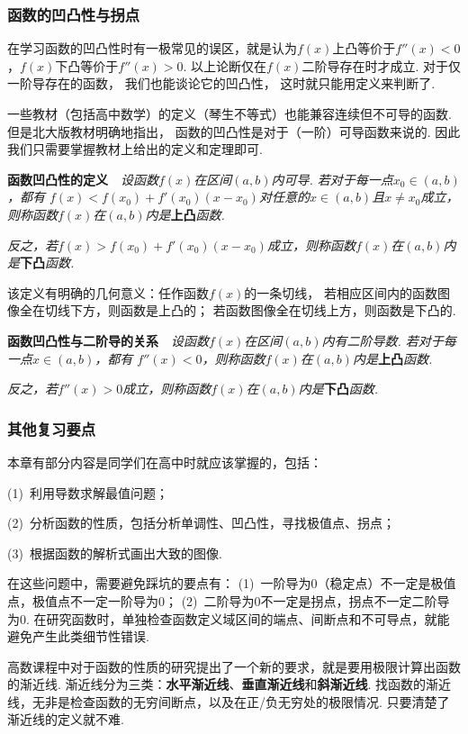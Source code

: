 \subsubsection{函数的凹凸性与拐点}\par
在学习函数的凹凸性时有一极常见的误区，就是认为$f(x)$上凸等价于$f''(x)<0$，$f(x)$下凸等价于$f''(x)>0$.
以上论断仅在$f(x)$二阶导存在时才成立.
对于仅一阶导存在的函数，
我们也能谈论它的凹凸性，
这时就只能用定义来判断了.

一些教材（包括高中数学）的定义（琴生不等式）也能兼容连续但不可导的函数.
但是北大版教材明确地指出，
函数的凹凸性是对于（一阶）可导函数来说的.
因此我们只需要掌握教材上给出的定义和定理即可.\par \vspace{1em}

\textbf{函数凹凸性的定义}~~\textit{设函数$f(x)$在区间$(a,b)$内可导. 若对于每一点$x_0 \in (a,b)$，都有
$f(x) < f(x_0) + f'(x_0)(x-x_0)$对任意的$x \in (a,b)$且$x \ne x_0$成立，则称函数$f(x)$在$(a,b)$内是}\textbf{上凸}\textit{函数.} \par
\textit{反之，若$f(x) > f(x_0) + f'(x_0)(x-x_0)$成立，则称函数$f(x)$在$(a,b)$内是}\textbf{下凸}\textit{函数.}\par \vspace{1em}

该定义有明确的几何意义：任作函数$f(x)$的一条切线，
若相应区间内的函数图像全在切线下方，则函数是上凸的；
若函数图像全在切线上方，则函数是下凸的. \par \vspace{1em}

\textbf{函数凹凸性与二阶导的关系}~~\textit{设函数$f(x)$在区间$(a,b)$内有二阶导数. 若对于每一点$x \in (a,b)$，都有
$f''(x)<0$，则称函数$f(x)$在$(a,b)$内是}\textbf{上凸}\textit{函数.}

\textit{反之，若$f''(x)>0$成立，则称函数$f(x)$在$(a,b)$内是}\textbf{下凸}\textit{函数.}\par \vspace{1em}

\subsubsection{其他复习要点}
本章有部分内容是同学们在高中时就应该掌握的，包括：\par
(1)~利用导数求解最值问题；\par
(2)~分析函数的性质，包括分析单调性、凹凸性，寻找极值点、拐点； \par
(3)~根据函数的解析式画出大致的图像. \par
在这些问题中，需要避免踩坑的要点有：
(1)~一阶导为$0$（稳定点）不一定是极值点，极值点不一定一阶导为$0$；
(2)~二阶导为$0$不一定是拐点，拐点不一定二阶导为$0$.
在研究函数时，单独检查函数定义域区间的端点、间断点和不可导点，就能避免产生此类细节性错误. \par
高数课程中对于函数的性质的研究提出了一个新的要求，就是要用极限计算出函数的渐近线.
渐近线分为三类：\textbf{水平渐近线}、\textbf{垂直渐近线}和\textbf{斜渐近线}.
找函数的渐近线，无非是检查函数的无穷间断点，以及在正/负无穷处的极限情况.
只要清楚了渐近线的定义就不难. \par

